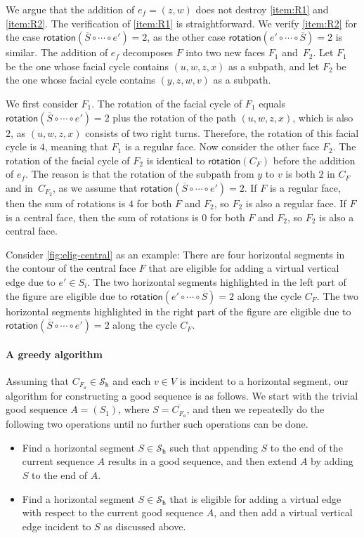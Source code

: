 \documentclass{article}\usepackage[a4paper,margin=20mm]{geometry}
\newcommand{\FO}{F_\mathsf{o}}
\newcommand{\PH}{\mathcal{S}_\mathsf{h}}
\newcommand{\rotation}{\mathsf{rotation}}
\begin{document}
We argue that the addition of $e_f=(z,w)$ does not  destroy \ref{item:R1} and \ref{item:R2}. The verification of \ref{item:R1} is straightforward. We verify \ref{item:R2} for the case  $\rotation(\overline{S} \circ \cdots \circ e') = 2$, as the other case $\rotation(e' \circ \cdots \circ \overline{S}) = 2$ is similar. The addition of $e_f$ decomposes $F$ into two new faces $F_1$ and~$F_2$. 
Let $F_1$ be the one whose facial cycle contains $(u,w,z,x)$ as a subpath, and let $F_2$ be the one whose facial cycle contains $(y,z,w,v)$ as a subpath.

We first consider $F_1$.
  The rotation of the facial cycle of $F_1$ equals $\rotation(\overline{S} \circ \cdots \circ e') = 2$ plus the rotation of the path $(u,w,z,x)$, which is also $2$, as $(u,w,z,x)$ consists of two right turns. 
Therefore, the rotation of this facial cycle is $4$, meaning that $F_1$ is a regular face.
Now consider the other face $F_2$.  The rotation of the facial cycle of $F_2$ is identical to $\rotation(C_F)$ before the addition of $e_f$. The reason is that the rotation of the subpath from $y$ to $v$ is both $2$ in $C_F$ and in~$C_{F_2}$, as we assume that $\rotation(\overline{S} \circ \cdots \circ e') = 2$. If $F$ is a regular face, then the sum of rotations is $4$ for both $F$ and $F_2$, so $F_2$ is also a regular face. If $F$ is a central face, then the sum of rotations is $0$ for both $F$ and $F_2$, so $F_2$ is also a central face. 

Consider \cref{fig:elig-central} as an example: There are four horizontal segments in the contour of the central face $F$ that are eligible for adding a virtual vertical edge due to $e' \in S_i$.
The two horizontal segments highlighted in the left part of the figure are eligible due to  $\rotation(e' \circ \cdots \circ \overline{S}) = 2$ along the cycle $C_F$.  The two horizontal segments highlighted in the right part of the figure are eligible due to  $\rotation(\overline{S} \circ \cdots \circ e') = 2$ along the cycle $C_F$.



\paragraph{A greedy algorithm} Assuming that $C_{\FO} \in \PH$ and each $v \in V$ is incident to a horizontal segment, our algorithm for constructing a good sequence is as follows. We start with the trivial good sequence $A=(S_1)$, where  $S  = \overline{C_{\FO}}$, 
and then we repeatedly do the following two operations until no further such operations can be done.
\begin{itemize}
    \item Find a horizontal segment $S \in \PH$ such that appending $S$ to the end of the current sequence $A$ results in a good sequence, and then extend $A$ by adding $S$ to the end of $A$.
    \item Find a horizontal segment $S \in \PH$ that is eligible for adding a virtual edge with respect to the current good sequence $A$, and then add a virtual vertical edge incident to $S$ as discussed above.
\end{itemize}
\end{document}
